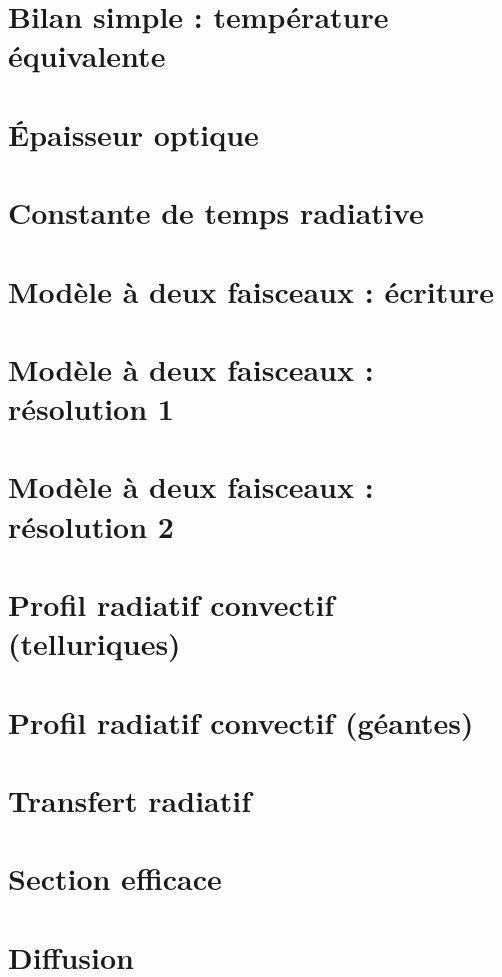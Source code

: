\documentclass[a4paper,DIV16,10pt]{scrartcl}
\begin{document}
\newpage
\section{Bilan simple : température équivalente}



\newpage
\section{\'Epaisseur optique}


\newpage
\section{Constante de temps radiative}


\newpage
\section{Modèle à deux faisceaux : écriture}


\newpage
\section{Modèle à deux faisceaux : résolution 1}


\newpage
\section{Modèle à deux faisceaux : résolution 2}


\newpage
\section{Profil radiatif convectif (telluriques)}


\newpage
\section{Profil radiatif convectif (géantes)}


\newpage
\section{Transfert radiatif}


\newpage
\section{Section efficace}


\newpage 
\section{Diffusion}

\end{document}
